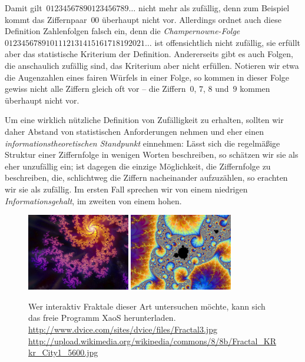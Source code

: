 \documentclass[twoside]{../zirkelblatt1415}
\theoremstyle{definition}
\theoremstyle{plain}
\theoremstyle{remark}
\begin{document}
Damit gilt~$01234567890123456789\ldots$ nicht mehr als zufällig, denn zum
Beispiel kommt das Ziffernpaar~$00$ überhaupt nicht vor. Allerdings ordnet auch
diese Definition Zahlenfolgen falsch ein, denn die \emph{Champernowne-Folge}
$0123456789101112131415161718192021\ldots$ ist offensichtlich nicht zufällig,
sie erfüllt aber das statistische Kriterium der Definition. Andererseits gibt
es auch Folgen, die anschaulich zufällig sind, das Kriterium aber nicht
erfüllen. Notieren wir etwa die Augenzahlen eines fairen Würfels in einer
Folge, so kommen in dieser Folge gewiss nicht alle Ziffern gleich oft vor --
die Ziffern~$0$, $7$, $8$ und~$9$ kommen überhaupt nicht vor.

Um eine wirklich nützliche Definition von Zufälligkeit zu erhalten, sollten wir
daher Abstand von statistischen Anforderungen nehmen und eher einen
\emph{informationstheoretischen Standpunkt} einnehmen: Lässt sich die
regelmäßige Struktur einer Ziffernfolge in wenigen Worten beschreiben, so
schätzen wir sie als eher unzufällig ein; ist dagegen die einzige Möglichkeit,
die Ziffernfolge zu beschreiben, die, schlichtweg die Ziffern nacheinander
aufzuzählen, so erachten wir sie als zufällig. Im ersten Fall sprechen wir von
einem niedrigen \emph{Informationsgehalt}, im zweiten von einem hohen.

\begin{figure}[b]
  \hfill
  \includegraphics[width=0.4\textwidth]{fraktal1}\hfill
  \includegraphics[width=0.4\textwidth]{fraktal2}\hfill
  \centering
  \caption{\label{fig:fraktale}Wer interaktiv Fraktale dieser Art
  untersuchen möchte, kann sich das freie Programm XaoS herunterladen. \newline
  {\tiny
  \url{http://www.dvice.com/sites/dvice/files/Fractal3.jpg}
  \url{http://upload.wikimedia.org/wikipedia/commons/8/8b/Fractal_KRkr_City1_5600.jpg}}}
\end{figure}
\end{document}
